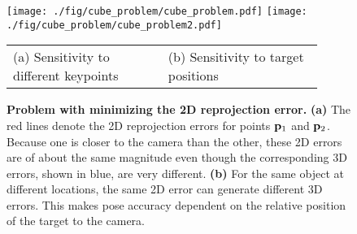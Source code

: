 
\begin{figure}[t]
\centering
\texttt{[image: ./fig/cube\_problem/cube\_problem.pdf]}
\texttt{[image: ./fig/cube\_problem/cube\_problem2.pdf]}
\begin{tabular}{C{0.45\linewidth}C{0.45\linewidth}}
{\scriptsize (a) Sensitivity to different keypoints} & {\scriptsize (b) Sensitivity to target positions}
\end{tabular}
\vspace{-5mm}
\caption{\small {\bf Problem with minimizing the 2D reprojection error.} {\bf (a)} The red lines denote the 2D reprojection errors for points ${\bf p}_1$ and ${\bf p}_2$. Because one is closer to the camera than the other, these 2D errors are of about the same magnitude even though the corresponding 3D errors, shown in blue, are very different. {\bf(b)} For the same object at different locations, the same 2D error can generate different 3D errors. This makes pose accuracy dependent on the relative position of the target to the camera. 
}
\label{fig:cube_problem}
\end{figure}